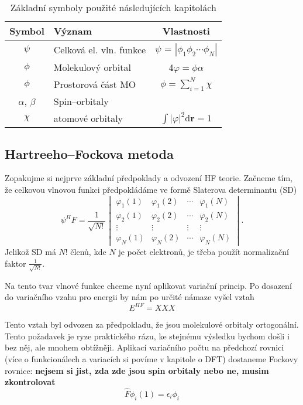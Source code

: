 \begin{table}[ht]
\centering
\caption{Základní symboly použité následujících kapitolách}
\begin{tabular}{|c|l|c|}
\hline 
\rule[-1ex]{0pt}{2.5ex} Symbol & 	Význam	& Vlastnosti \\ 
\hline 
\rule[-1ex]{0pt}{2.5ex} $\psi$ & Celková el. vln. funkce  & $\psi$ = $|\phi_1 \phi_2 \cdots \phi_N |$ \\ 
\hline 
\rule[-1ex]{0pt}{2.5ex} $\phi$ & Molekulový orbital & 4$\varphi=\phi \alpha $\\ 
\hline 
\rule[-1ex]{0pt}{2.5ex} $\phi$ & Prostorová část MO & $\phi=\sum_{i=1}^N \chi $ \\ 
\hline 
\rule[-1ex]{0pt}{2.5ex} $\alpha$, $\beta$  & Spin--orbitaly & \\ 
\hline 
\rule[-1ex]{0pt}{2.5ex} $\chi$ & atomové orbitaly & $\int |\varphi|^2 \mathrm{d}\textbf{r} = 1 $
\hline
\label{tab:vlnfunkce}
\end{tabular} 
\end{table}

\subsection{Hartreeho--Fockova metoda}

Zopakujme si nejprve základní předpoklady a odvození HF teorie. Začneme tím, že celkovou vlnovou funkci předpokládáme ve formě Slaterova determinantu (SD)
\begin{equation}
\psi^HF=\frac{1}{\sqrt{N!}}\begin{vmatrix}
\varphi_1(1) & \varphi_1(2) & \cdots & \varphi_1(N) \\
\varphi_2(1) & \varphi_2(2) & \cdots & \varphi_2(N) \\
\vdots & \vdots & \vdots & \vdots \\
\varphi_N(1) & \varphi_N (2) & \cdots & \varphi_N(N)
\end{vmatrix}.
\end{equation}
Jelikož SD má $N!$ členů, kde $N$ je počet elektronů, je třeba použít normalizační faktor $\frac{1}{\sqrt{N!}}$.

Na tento tvar vlnové funkce chceme nyní aplikovat variační princip. Po dosazení do variačního vzahu pro energii by nám po určité námaze vyšel vztah
\begin{equation}
E^{HF}=  XXX 
\end{equation}

Tento vztah byl odvozen za předpokladu, že jsou molekulové orbitaly ortogonální. Tento požadavek je ryze praktického rázu, ke stejnému výsledku bychom došli i bez něj, ale mnohem obtížněji. Aplikací variačního počtu na předchozí rovnici (více o funkcionálech a variacích si povíme v kapitole o DFT) dostaneme Fockovy rovnice: \textbf{nejsem si jist, zda zde jsou spin orbitaly nebo ne, musim zkontrolovat}
\begin{equation}
\hat{F}\phi_i(1) = \epsilon_i \phi_i   
\end{equation}

